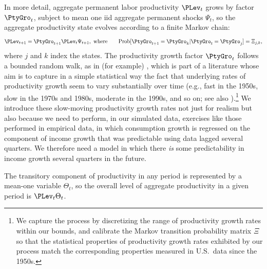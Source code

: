 \documentclass[titlepage]{\econtex}\newcommand{\texname}{cAndCwithStickyE}
\begin{document}
In more detail, aggregate permanent labor productivity $\PLev_t$ grows by factor $\PtyGro_t$, subject to mean one iid aggregate permanent shocks $\Psi_t$, so the aggregate productivity state evolves according to a finite Markov chain:
\begin{equation}
{\PLev}_{t+1} = \PtyGro_{t+1} {\PLev}_{t}\Psi_{t+1}, \text{ where} \qquad\text{Prob}[\PtyGro_{t+1}=\PtyGro_k | \PtyGro_t = \PtyGro_j] = \Xi_{j,k},   \label{eq:AggRandWalk}
\end{equation}
where $j$ and $k$ index the states. The productivity growth factor $\PtyGro_t$ follows a bounded random walk, as in (for example) \cite{edge2007Learning}, which is part of a literature whose aim is to capture in a simple statistical way the fact that underlying rates of productivity growth seem to vary substantially over time (e.g., fast in the 1950s, slow in the 1970s and 1980s, moderate in the 1990s, and so on; see also \cite{jorgenson:ProductivityGrowthResurgence}).\footnote{We capture the process by discretizing the range of productivity growth rates within our bounds, and calibrate the Markov transition probability matrix $\Xi$ so that the statistical properties of productivity growth rates exhibited by our process match the corresponding properties measured in U.S.\ data since the 1950s.}  We introduce these slow-moving productivity growth rates not just for realism but also because we need to perform, in our simulated data, exercises like those \cite{cmModel} performed in empirical data, in which consumption growth is regressed on the component of income growth that was predictable using data lagged several quarters.  We therefore need a model in which there {\it is} some predictability in income growth several quarters in the future.

The transitory component of productivity in any period is represented by a mean-one variable $\Theta_t$, so the overall level of aggregate productivity in a given period is $\PLev_{t}\Theta_{t}$.
\end{document}
